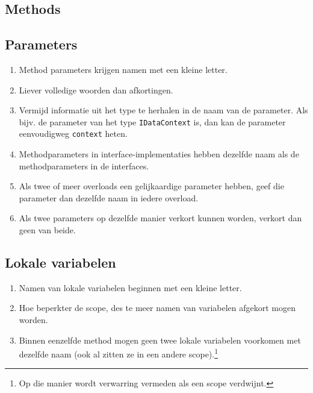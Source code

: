 \documentclass[a4paper,11pt]{article}
\begin{document}
\subsection{Methods}

\subsection{Parameters}
\begin{enumerate}[resume]
\item Method parameters krijgen namen met een kleine letter.
\item Liever volledige woorden dan afkortingen.
\item Vermijd informatie uit het type te herhalen in de naam van de
parameter.  Als bijv. de parameter van het type \lstinline !IDataContext!
is, dan kan de parameter eenvoudigweg \lstinline !context! heten.
\item Methodparameters in interface-implementaties hebben dezelfde naam als de
methodparameters in de interfaces.
\item Als twee of meer overloads een gelijkaardige parameter hebben, geef
die parameter dan dezelfde naam in iedere overload.
\item Als twee parameters op dezelfde manier verkort kunnen worden,
verkort dan geen van beide.
\end{enumerate}

\subsection{Lokale variabelen}
\begin{enumerate}[resume]
\item Namen van lokale variabelen beginnen met een kleine letter.
\item Hoe beperkter de scope, des te meer namen van variabelen afgekort
mogen worden.
\item Binnen eenzelfde method mogen geen twee lokale variabelen voorkomen
met dezelfde naam (ook al zitten ze in een andere scope).\footnote{Op die
manier wordt verwarring vermeden als een scope verdwijnt.}
\end{enumerate}
\end{document}

